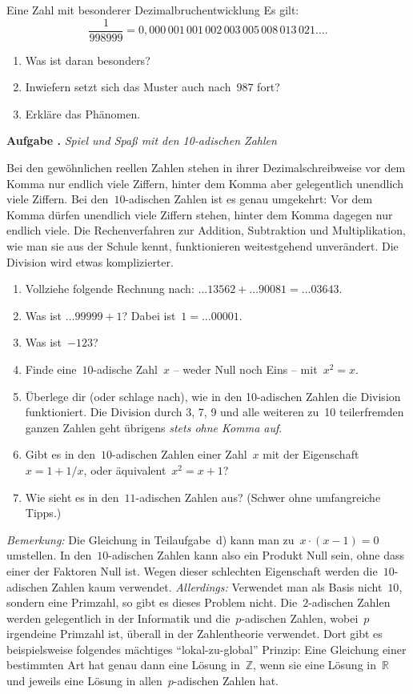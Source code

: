 \documentclass[a4paper,ngerman,twoside]{scrartcl}
\newlength{\aufgabenskip}
\newcounter{aufgabennummer}
\newenvironment{aufgabe}[1]{
  \addtocounter{aufgabennummer}{1}
  \textbf{Aufgabe \theaufgabennummer.} \emph{#1} \par
}{\vspace{\aufgabenskip}}
\newenvironment{aufgabe*}[1]{
  \addtocounter{aufgabennummer}{1}
  \textbf{Aufgabe* \theaufgabennummer.} \emph{#1} \par
}{\vspace{\aufgabenskip}}
\begin{document}
\begin{aufgabe*}{Eine Zahl mit besonderer Dezimalbruchentwicklung}
Es gilt:
\[ \frac{1}{998999} =
  0{,}000\,001\,001\,002\,003\,005\,008\,013\,021\ldots. \]
\begin{enumerate}
\item Was ist daran besonders?
\item Inwiefern setzt sich das Muster auch nach~$987$ fort?
\item Erkläre das Phänomen.
\end{enumerate}
\end{aufgabe*}

\begin{aufgabe}{Spiel und Spaß mit den 10-adischen Zahlen}
Bei den gewöhnlichen reellen Zahlen stehen in ihrer Dezimalschreibweise vor dem
Komma nur endlich viele Ziffern, hinter dem Komma aber gelegentlich unendlich
viele Ziffern. Bei den~$10$-adischen Zahlen ist es genau umgekehrt: Vor dem
Komma dürfen unendlich viele Ziffern stehen, hinter dem Komma dagegen nur
endlich viele. Die Rechenverfahren zur Addition, Subtraktion und
Multiplikation, wie man sie aus der Schule kennt, funktionieren weitestgehend
unverändert. Die Division wird etwas komplizierter.
\begin{enumerate}
\item Vollziehe folgende Rechnung nach:
$\ldots 13562 + \ldots 90081 = \ldots 03643$.
\item Was ist $\ldots 99999 + 1$? Dabei ist~$1 = \ldots 00001$.
\item Was ist~$-123$?
\item Finde eine~$10$-adische Zahl~$x$ -- weder Null noch Eins -- mit~$x^2 = x$.
\item Überlege dir (oder schlage nach), wie in den 10-adischen Zahlen die
Division funktioniert. Die Division durch 3, 7, 9 und alle weiteren zu~10
teilerfremden ganzen Zahlen geht übrigens \emph{stets ohne Komma auf}.
\item Gibt es in den~$10$-adischen Zahlen einer Zahl~$x$ mit der
Eigenschaft~$x = 1 + 1/x$, oder äquivalent~$x^2 = x + 1$?
\item Wie sieht es in den~$11$-adischen Zahlen aus? (Schwer ohne umfangreiche
Tipps.)
\end{enumerate}
{\scriptsize
\emph{Bemerkung:} Die Gleichung in Teilaufgabe~d) kann man zu~$x \cdot (x-1) =
0$ umstellen. In den~$10$-adischen Zahlen kann also ein Produkt Null sein, ohne
dass einer der Faktoren Null ist. Wegen dieser schlechten Eigenschaft werden
die~$10$-adischen Zahlen kaum verwendet. \emph{Allerdings:} Verwendet man als
Basis nicht~$10$, sondern eine Primzahl, so gibt es dieses Problem nicht.
Die~$2$-adischen Zahlen werden gelegentlich in der Informatik und
die~$p$-adischen Zahlen, wobei~$p$ irgendeine Primzahl ist, überall in der
Zahlentheorie verwendet. Dort gibt es beispielsweise folgendes mächtiges
"`lokal-zu-global"' Prinzip: Eine Gleichung einer bestimmten Art hat genau dann
eine Lösung in~$\mathbb{Z}$, wenn sie eine Lösung in~$\mathbb{R}$ und jeweils
eine Lösung in allen~$p$-adischen Zahlen hat.\par}
\end{aufgabe}
\end{document}
